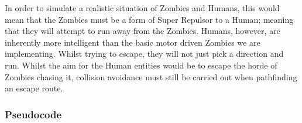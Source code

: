In order to simulate a realistic situation of Zombies and Humans, this would mean that the Zombies must be a form of Super Repulsor to a Human; meaning that they will attempt to run away from the Zombies. Humans, however, are inherently more intelligent than the basic motor driven Zombies we are implementing. Whilst trying to escape, they will not just pick a direction and run. Whilst the aim for the Human entities would be to escape the horde of Zombies chasing it, collision avoidance must still be carried out when pathfinding an escape route. 


\subsubsection{Pseudocode}
